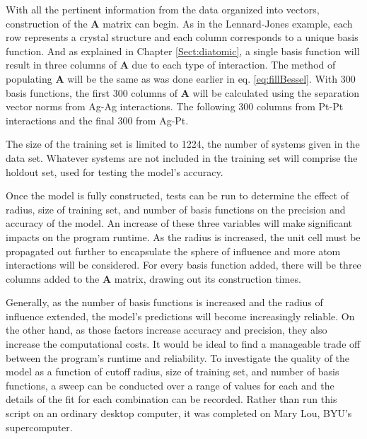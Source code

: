 \par With all the pertinent information from the data organized into vectors, construction of the $\mathbf{A}$ matrix can begin. As in the Lennard-Jones example, each row represents a crystal structure and each column corresponds to a unique basis function. And as explained in Chapter \ref{Sect:diatomic}, a single basis function will result in three columns of $\mathbf{A}$ due to each type of interaction. The method of populating $\mathbf{A}$ will be the same as was done earlier in eq. \ref{eq:fillBessel}. With 300 basis functions, the first 300 columns of $\mathbf{A}$ will be calculated using the separation vector norms from Ag-Ag interactions. The following 300 columns from Pt-Pt interactions and the final 300 from Ag-Pt.
\par The size of the training set is limited to 1224, the number of systems given in the data set. Whatever systems are not included in the training set will comprise the holdout set, used for testing the model's accuracy.
\par Once the model is fully constructed, tests can be run to determine the effect of radius, size of training set, and number of basis functions on the precision and accuracy of the model. An increase of these three variables will make significant impacts on the program runtime. As the radius is increased, the unit cell must be propagated out further to encapsulate the sphere of influence and more atom interactions will be considered. For every basis function added, there will be three columns added to the $\mathbf{A}$ matrix, drawing out its construction times. 
\par Generally, as the number of basis functions is increased and the radius of influence extended, the model's predictions will become increasingly reliable. On the other hand, as those factors increase accuracy and precision, they also increase the computational costs. It would be ideal to find a manageable trade off between the program's runtime and reliability. To investigate the quality of the model as a function of cutoff radius, size of training set, and number of basis functions, a sweep can be conducted over a range of values for each and the details of the fit for each combination can be recorded. Rather than run this script on an ordinary desktop computer, it was completed on Mary Lou, BYU's supercomputer. 
